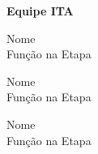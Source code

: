 
\vspace*{2cm}    %
\begin{flushright}
	
	\textbf{Equipe ITA}\\
	\vspace*{1cm}
	
	Nome\\
	Função na Etapa\\
	\vspace*{1cm}
	
	Nome\\
	Função na Etapa\\
	\vspace*{1cm}
	
	Nome\\
	Função na Etapa\\
	\vspace*{1cm}

\end{flushright}